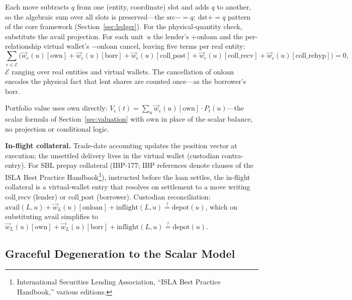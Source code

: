 \begin{proposition}
\label{prop:gpm-conservation}
Each move subtracts $q$ from one (entity, coordinate) slot and adds $q$ to another, so the algebraic sum over all slots is preserved---the $\mathrm{src}\mathbin{{-}{=}}q;\ \mathrm{dst}\mathbin{{+}{=}}q$ pattern of the core framework (Section~\ref{sec:ledger}). For the physical-quantity check, substitute the $\mathrm{avail}$ projection. For each unit~$u$ the lender's $+\mathrm{onloan}$ and the per-relationship virtual wallet's $-\mathrm{onloan}$ cancel, leaving five terms per real entity:
\[
\sum_{e \in \mathcal{E}} \bigl( \vec{w}_e(u)[\mathrm{own}] + \vec{w}_e(u)[\mathrm{borr}] + \vec{w}_e(u)[\mathrm{coll\_post}] + \vec{w}_e(u)[\mathrm{coll\_recv}] + \vec{w}_e(u)[\mathrm{coll\_rehyp}] \bigr) = 0,
\]
$\mathcal{E}$ ranging over real entities and virtual wallets. The cancellation of $\mathrm{onloan}$ encodes the physical fact that lent shares are counted once---as the borrower's $\mathrm{borr}$.
\end{proposition}

\noindent Portfolio value uses $\mathrm{own}$ directly: $V_e(t) = \sum_{u} \vec{w}_e(u)[\mathrm{own}]\cdot P_t(u)$---the scalar formula of Section~\ref{sec:valuation} with $\mathrm{own}$ in place of the scalar balance, no projection or conditional logic.

\noindent\textbf{In-flight collateral.} Trade-date accounting updates the position vector at execution; the unsettled delivery lives in the virtual wallet (custodian contra-entry). For SBL prepay collateral (IBP-177; IBP references denote clauses of the ISLA Best Practice Handbook\footnote{International Securities Lending Association, ``ISLA Best Practice Handbook,'' various editions.}), instructed before the loan settles, the in-flight collateral is a virtual-wallet entry that resolves on settlement to a move writing $\mathrm{coll\_recv}$ (lender) or $\mathrm{coll\_post}$ (borrower). Custodian reconciliation: $\mathrm{avail}(L,u) + \vec{w}_L(u)[\mathrm{onloan}] + \mathrm{inflight}(L,u) \stackrel{?}{=} \text{depot}(u)$, which on substituting $\mathrm{avail}$ simplifies to $\vec{w}_L(u)[\mathrm{own}] + \vec{w}_L(u)[\mathrm{borr}] + \mathrm{inflight}(L,u) \stackrel{?}{=} \text{depot}(u)$.

\subsection{Graceful Degeneration to the Scalar Model}
\label{sec:degeneration}

